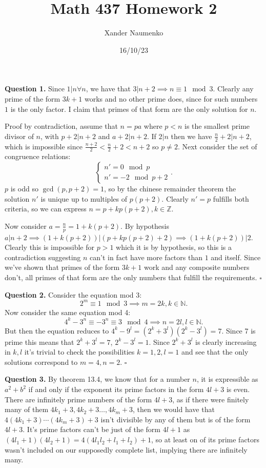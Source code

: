\documentclass[letterpaper, reqno,11pt]{article}
\begin{document}
\title{Math 437 Homework 2}
\date{16/10/23}
\author{Xander Naumenko}
\maketitle

{\medskip\noindent\bf Question 1.} Since $1|n\forall n$, we have that $3|n+2\implies n\equiv 1\mod 3$. Clearly any prime of the form $3k+1$ works and no other prime does, since for such numbers $1$ is the only factor. I claim that primes of that form are the only solution for $n$. 

Proof by contradiction, assume that $n=pa$ where $p<n$ is the smallest prime divisor of $n$, with $p+2|n+2$ and $a+2|n+2$. If $2|n$ then we have $\frac{n}{2}+2|n+2$, which is impossible since $\frac{n+2}{2}<\frac{n}{2}+2<n+2$ so $p\neq 2$. Next consider the set of congruence relations:
\[
    \begin{cases}
        n'=0\mod p\\
        n'=-2\mod p+2
    \end{cases}
.\]
$p$ is odd so $\gcd(p,p+2)=1$, so by the chinese remainder theorem the solution $n'$ is unique up to multiples of $p(p+2)$. Clearly $n'=p$ fulfills both criteria, so we can express $n=p+kp(p+2),k\in \mathbb{Z}$.

Now consider $a=\frac{n}{p}=1+k(p+2)$. By hypothesis $a|n+2\implies (1+k(p+2))|(p+kp(p+2)+2)\implies (1+k(p+2))|2$. Clearly this is impossible for $p>1$ which it is by hypothesis, so this is a contradiction suggesting $n$ can't in fact have more factors than $1$ and itself. Since we've shown that primes of the form $3k+1$ work and any composite numbers don't, all primes of that form are the only numbers that fulfill the requirements. $\square$

{\medskip\noindent\bf Question 2.} Consider the equation mod 3:
\[
2^{m}\equiv 1\mod 3\implies m=2k, k\in \mathbb{N}
.\]
Now consider the same equation mod 4:
\[
4^{k}-3^{n}\equiv -3^{n}\equiv 3\mod 4\implies n=2l, l\in \mathbb{N}
.\]
But then the equation reduces to $4^{k}-9^{l}=(2^{k}+3^{l})(2^{k}-3^{l})=7$. Since 7 is prime this means that $2^{k}+3^{l}=7$, $2^{k}-3^{l}=1$. Since $2^{k}+3^{l}$ is clearly increasing in $k,l$ it's trivial to check the possibilities $k=1,2,l=1$ and see that the only solutions correspond to $m=4,n=2$. $\square$

{\medskip\noindent\bf Question 3.} By theorem 13.4, we know that for a number $n$, it is expressible as $a^2+b^2$ if and only if the exponent its prime factors in the form $4l+3$ is even. There are infinitely prime numbers of the form $4l+3$, as if there were finitely many of them $4k_1+3,4k_2+3\ldots, 4k_m+3$, then we would have that $4(4k_1+3)\cdots (4k_m+3)+3$ isn't divisible by any of them but is of the form $4l+3$. It's prime factors can't be just of the form $4l+1$ as $(4l_1+1)(4l_2+1)=4(4l_1l_2+l_1+l_2)+1$, so at least on of its prime factors wasn't included on our supposedly complete list, implying there are infinitely many.
\end{document}
